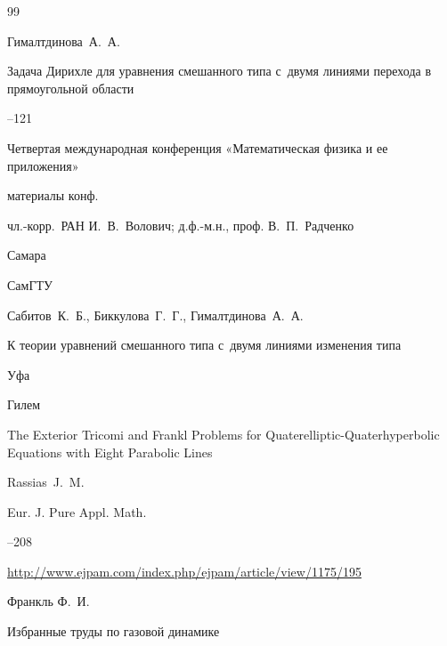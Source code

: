\begin{thebibliography}{99}




\by Гималтдинова~А.~А. 

\paper Задача Дирихле для уравнения смешанного типа с~двумя линиями перехода в прямоугольной области 

--121

\inbook Четвертая международная конференция «Математическая физика и ее приложения»

\bookinfo материалы конф. 

\eds чл.-корр.~РАН И.~В.~Волович; д.ф.-м.н., проф. В.~П.~Радченко

\publaddr Самара

\publ СамГТУ







\by Сабитов~К.~Б., Биккулова~Г.~Г., Гималтдинова~А.~А.

\book К теории уравнений смешанного типа с~двумя линиями изменения типа

\publaddr Уфа

\publ Гилем








\paper The Exterior Tricomi and Frankl Problems for Quaterelliptic-Quater\-hyper\-bolic Equations with Eight Parabolic Lines

\by Rassias~J.~M.

\jour Eur. J. Pure Appl. Math.




--208

\elink \url{http://www.ejpam.com/index.php/ejpam/article/view/1175/195}








\by Франкль Ф.~И.

\book Избранные труды по газовой динамике


\end{thebibliography}
